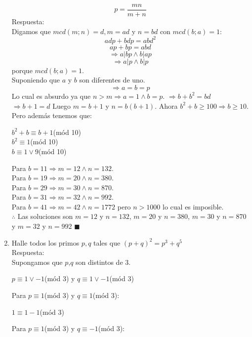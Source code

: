 \documentclass{book}
\begin{document}
\begin{enumerate}
        $$p=\frac{mn}{m+n}$$
        Respuesta:\\
        Digamos que $mcd(m;n) = d, m = ad$ y $n = bd$ con $mcd(b;a) = 1$:
        $$adp + bdp = abd^2$$
        $$ap + bp = abd$$
        $$\Rightarrow a |bp    \wedge   b| ap $$
        $$\Rightarrow a| p    \wedge   b |p $$
        porque $mcd(b;a) =1$. \\
        Suponiendo que $a$ y $b$ son diferentes de uno.
        $$\Rightarrow a=b=p$$
        Lo cual es absurdo ya que $n > m \Rightarrow a = 1 \wedge b=p$. $\Rightarrow                b + b^2 = bd$
        $\Rightarrow b + 1 = d$ Luego $m = b + 1$ y $n = b(b + 1)$. Ahora $b^2 + b                        \geq 100 \Rightarrow b \geq 10$. Pero además tenemos que:
        \begin{center}
            $b^2 + b \equiv b + 1$(mód 10)\\
            $b^2 \equiv 1$(mód 10)\\
            $b \equiv 1 \vee 9$(mód 10)\\
        \end{center}
        Para $b= 11 \Rightarrow m = 12 \wedge n = 132$. \\
        Para $b = 19 \Rightarrow m = 20 \wedge n = 380$. \\
        Para $b = 29 \Rightarrow m = 30 \wedge n = 870$. \\
        Para $b = 31 \Rightarrow m = 32 \wedge n = 992$. \\
        Para $ b = 41 \Rightarrow m= 42 \wedge n = 1772$ pero $n > 1000$ lo cual es imposible. \\
        $\therefore$ Las soluciones son $m= 12$ y $n= 132$, $m= 20$ y $n= 380$, $m= 30$ y $n= 870$ y $m= 32$ y $n= 992$ $\blacksquare$\\
        \item Halle todos los primos $p,q$ tales que ${(p+q)}^2 = p^3+q^5$ \\
        Respuesta:\\
        Supongamos que $p$,$q$ son distintos de 3.
        \begin{center}
            $p\equiv 1 \vee -1$(mód 3)  y $q\equiv 1 \vee -1$(mód 3)
        \end{center}
        Para $p\equiv 1$(mód 3)  y $q\equiv 1 $(mód 3):
        \begin{center}
            $1\equiv 1-1$(mód 3)
        \end{center}
        Para $p\equiv 1 $(mód 3)  y $q\equiv -1 $(mód 3):
        \begin{center}

\end{center}
\end{enumerate}
\end{document}

